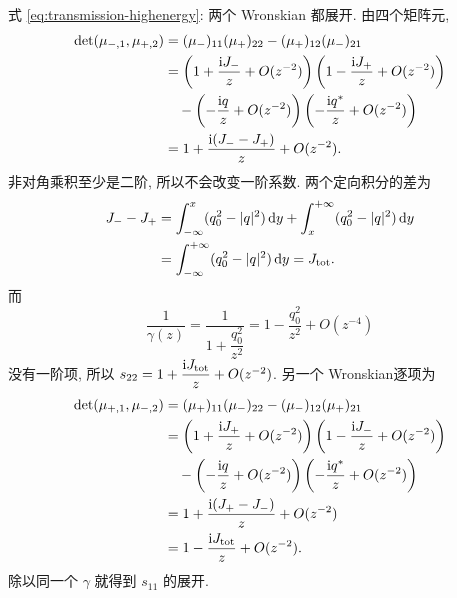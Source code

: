 \par\smallskip\noindent 式 \eqref{eq:transmission-highenergy}: 两个 Wronskian 都展开.\quad
由四个矩阵元,
\begin{align*}
\det(\mu_{-,1},\mu_{+,2})
&=(\mu_-)_{11}(\mu_+)_{22}-(\mu_+)_{12}(\mu_-)_{21}\\
&=\left(1+\dfrac{\mathrm{i} J_-}{z}+O(z^{-2})\right)
\left(1-\dfrac{\mathrm{i} J_+}{z}+O(z^{-2})\right)\\
&\quad-\left(-\dfrac{\mathrm{i} q}{z}+O(z^{-2})\right)
\left(-\dfrac{\mathrm{i}{q}^{*}}{z}+O(z^{-2})\right)\\
&=1+\dfrac{\mathrm{i}(J_--J_+)}{z}+O(z^{-2}).
\end{align*}
非对角乘积至少是二阶, 所以不会改变一阶系数.
两个定向积分的差为
\begin{align*}
J_--J_+
&=\int_{-\infty}^{x}(q_0^2-|q|^2)\,\mathrm{d} y
+\int_x^{+\infty}(q_0^2-|q|^2)\,\mathrm{d} y\\
&=\int_{-\infty}^{+\infty}(q_0^2-|q|^2)\,\mathrm{d} y=J_{\rm tot}.
\end{align*}
而
\begin{equation*}
\dfrac{1}{\gamma(z)}
=\dfrac{1}{1+\dfrac{q_0^2}{z^2}}
=1-\dfrac{q_0^2}{z^2}+O(z^{-4})
\end{equation*}
没有一阶项, 所以 $s_{22}=1+\dfrac{\mathrm{i} J_{\rm tot}}{z}+O(z^{-2})$.
另一个 Wronskian逐项为
\begin{align*}
\det(\mu_{+,1},\mu_{-,2})
&=(\mu_+)_{11}(\mu_-)_{22}-(\mu_-)_{12}(\mu_+)_{21}\\
&=\left(1+\dfrac{\mathrm{i} J_+}{z}+O(z^{-2})\right)
\left(1-\dfrac{\mathrm{i} J_-}{z}+O(z^{-2})\right)\\
&\quad-\left(-\dfrac{\mathrm{i} q}{z}+O(z^{-2})\right)
\left(-\dfrac{\mathrm{i}{q}^{*}}{z}+O(z^{-2})\right)\\
&=1+\dfrac{\mathrm{i}(J_+-J_-)}{z}+O(z^{-2})\\
&=1-\dfrac{\mathrm{i} J_{\rm tot}}{z}+O(z^{-2}).
\end{align*}
除以同一个 $\gamma$ 就得到 $s_{11}$ 的展开.

